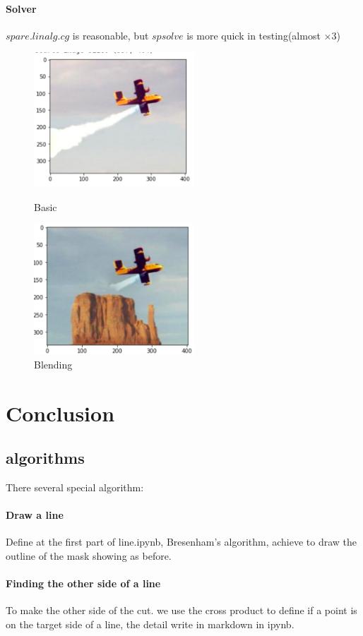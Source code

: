 \documentclass[letterpaper,12pt]{article}
\begin{document}
\paragraph{Solver}
$spare.linalg.cg$ is reasonable, but $spsolve$ is more quick in testing(almost $\times3$)
\begin{figure}[htbp]
	\centering
	\begin{minipage}[t]{0.48\textwidth}
		\centering
		\includegraphics[width=6cm]{Image/7-1.png}
		\caption{Basic}
	\end{minipage}
	\begin{minipage}[t]{0.48\textwidth}
		\centering
		\includegraphics[width=6cm]{Image/7-2.png}
		\caption{Blending}
	\end{minipage}
\end{figure}
\section{Conclusion}

\subsection{algorithms}
There several special algorithm:
\paragraph{Draw a line}
Define at the first part of line.ipynb, Bresenham’s algorithm, achieve to draw the outline of the mask showing as before.
\paragraph{Finding the other side of a line}
To make the other side of the cut. we use the cross product to define if a point is on the target side of a line, the detail write in markdown in ipynb.
\end{document}
